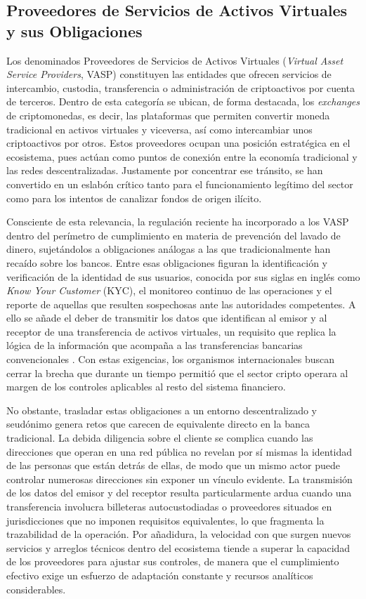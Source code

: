 \subsection{Proveedores de Servicios de Activos Virtuales y sus Obligaciones}

Los denominados Proveedores de Servicios de Activos Virtuales (\textit{Virtual Asset Service Providers}, VASP) constituyen las entidades que ofrecen servicios de intercambio, custodia, transferencia o administración de criptoactivos por cuenta de terceros. Dentro de esta categoría se ubican, de forma destacada, los \textit{exchanges} de criptomonedas, es decir, las plataformas que permiten convertir moneda tradicional en activos virtuales y viceversa, así como intercambiar unos criptoactivos por otros. Estos proveedores ocupan una posición estratégica en el ecosistema, pues actúan como puntos de conexión entre la economía tradicional y las redes descentralizadas. Justamente por concentrar ese tránsito, se han convertido en un eslabón crítico tanto para el funcionamiento legítimo del sector como para los intentos de canalizar fondos de origen ilícito.

Consciente de esta relevancia, la regulación reciente ha incorporado a los VASP dentro del perímetro de cumplimiento en materia de prevención del lavado de dinero, sujetándolos a obligaciones análogas a las que tradicionalmente han recaído sobre los bancos. Entre esas obligaciones figuran la identificación y verificación de la identidad de sus usuarios, conocida por sus siglas en inglés como \textit{Know Your Customer} (KYC), el monitoreo continuo de las operaciones y el reporte de aquellas que resulten sospechosas ante las autoridades competentes. A ello se añade el deber de transmitir los datos que identifican al emisor y al receptor de una transferencia de activos virtuales, un requisito que replica la lógica de la información que acompaña a las transferencias bancarias convencionales \cite{FATF2012InternationalRecommendations}. Con estas exigencias, los organismos internacionales buscan cerrar la brecha que durante un tiempo permitió que el sector cripto operara al margen de los controles aplicables al resto del sistema financiero.

No obstante, trasladar estas obligaciones a un entorno descentralizado y seudónimo genera retos que carecen de equivalente directo en la banca tradicional. La debida diligencia sobre el cliente se complica cuando las direcciones que operan en una red pública no revelan por sí mismas la identidad de las personas que están detrás de ellas, de modo que un mismo actor puede controlar numerosas direcciones sin exponer un vínculo evidente. La transmisión de los datos del emisor y del receptor resulta particularmente ardua cuando una transferencia involucra billeteras autocustodiadas o proveedores situados en jurisdicciones que no imponen requisitos equivalentes, lo que fragmenta la trazabilidad de la operación. Por añadidura, la velocidad con que surgen nuevos servicios y arreglos técnicos dentro del ecosistema tiende a superar la capacidad de los proveedores para ajustar sus controles, de manera que el cumplimiento efectivo exige un esfuerzo de adaptación constante y recursos analíticos considerables.

